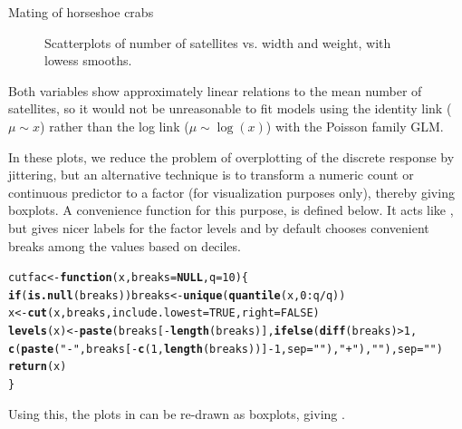 \documentclass[11pt]{book}\usepackage[]{graphicx}\usepackage[]{color}
\makeatletter
\newcommand{\hlnum}[1]{\textcolor[rgb]{0.686,0.059,0.569}{#1}}%
\newcommand{\hlstr}[1]{\textcolor[rgb]{0.192,0.494,0.8}{#1}}%
\newcommand{\hlopt}[1]{\textcolor[rgb]{0,0,0}{#1}}%
\newcommand{\hlstd}[1]{\textcolor[rgb]{0.345,0.345,0.345}{#1}}%
\newcommand{\hlkwa}[1]{\textcolor[rgb]{0.161,0.373,0.58}{\textbf{#1}}}%
\newcommand{\hlkwb}[1]{\textcolor[rgb]{0.69,0.353,0.396}{#1}}%
\newcommand{\hlkwc}[1]{\textcolor[rgb]{0.333,0.667,0.333}{#1}}%
\newcommand{\hlkwd}[1]{\textcolor[rgb]{0.737,0.353,0.396}{\textbf{#1}}}%
\newenvironment{kframe}{%
 \def\at@end@of@kframe{}%
 \ifinner\ifhmode%
  \def\at@end@of@kframe{\end{minipage}}%
  \begin{minipage}{\columnwidth}%
 \fi\fi%
 \def\FrameCommand##1{\hskip\@totalleftmargin \hskip-\fboxsep
 \colorbox{shadecolor}{##1}\hskip-\fboxsep
     \hskip-\linewidth \hskip-\@totalleftmargin \hskip\columnwidth}%
 \MakeFramed {\advance\hsize-\width
   \@totalleftmargin\z@ \linewidth\hsize
   \@setminipage}}%
 {\par\unskip\endMakeFramed%
 \at@end@of@kframe}
\newenvironment{knitrout}{}{} %
\renewenvironment{knitrout}{\small\renewcommand{\baselinestretch}{.85}}{} %
\makeatother
\begin{document}
\begin{Example}[crabs1]{Mating of horseshoe crabs}
\begin{knitrout}
\begin{figure}[!htbp]
\caption[Scatterplots of number of satellites vs]{Scatterplots of number of satellites vs. width and weight, with lowess smooths.\label{fig:crabs1-scats}}
\end{figure}


\end{knitrout}
Both variables show approximately linear relations to the mean number of satellites, so it
would not be unreasonable to fit models using the identity link ($\mu \sim x$) rather than the log link
($\mu \sim \log(x)$) with the Poisson family GLM. 

In these plots, we reduce the problem of overplotting of the discrete response by jittering, but
an alternative technique is to transform a numeric count or continuous predictor to
a factor (for visualization purposes only), thereby giving boxplots.  A convenience function for
this purpose,  is defined below.  It acts like , but gives nicer labels
for the factor levels and by default chooses convenient breaks among the values based on deciles.

\begin{knitrout}\footnotesize
{}\color{fgcolor}\begin{kframe}
\begin{alltt}
\hlstd{cutfac} \hlkwb{<-} \hlkwa{function}\hlstd{(}\hlkwc{x}\hlstd{,} \hlkwc{breaks} \hlstd{=} \hlkwa{NULL}\hlstd{,} \hlkwc{q}\hlstd{=}\hlnum{10}\hlstd{) \{}
  \hlkwa{if}\hlstd{(}\hlkwd{is.null}\hlstd{(breaks)) breaks} \hlkwb{<-} \hlkwd{unique}\hlstd{(}\hlkwd{quantile}\hlstd{(x,} \hlnum{0}\hlopt{:}\hlstd{q}\hlopt{/}\hlstd{q))}
  \hlstd{x} \hlkwb{<-} \hlkwd{cut}\hlstd{(x, breaks,} \hlkwc{include.lowest} \hlstd{=} \hlnum{TRUE}\hlstd{,} \hlkwc{right} \hlstd{=} \hlnum{FALSE}\hlstd{)}
  \hlkwd{levels}\hlstd{(x)} \hlkwb{<-} \hlkwd{paste}\hlstd{(breaks[}\hlopt{-}\hlkwd{length}\hlstd{(breaks)],} \hlkwd{ifelse}\hlstd{(}\hlkwd{diff}\hlstd{(breaks)} \hlopt{>} \hlnum{1}\hlstd{,}
    \hlkwd{c}\hlstd{(}\hlkwd{paste}\hlstd{(}\hlstr{"-"}\hlstd{, breaks[}\hlopt{-}\hlkwd{c}\hlstd{(}\hlnum{1}\hlstd{,} \hlkwd{length}\hlstd{(breaks))]} \hlopt{-} \hlnum{1}\hlstd{,} \hlkwc{sep} \hlstd{=} \hlstr{""}\hlstd{),} \hlstr{"+"}\hlstd{),} \hlstr{""}\hlstd{),} \hlkwc{sep} \hlstd{=} \hlstr{""}\hlstd{)}
  \hlkwd{return}\hlstd{(x)}
\hlstd{\}}
\end{alltt}
\end{kframe}
\end{knitrout}

Using this, the plots in  can be re-drawn as boxplots, giving .


\end{Example}
\end{document}
